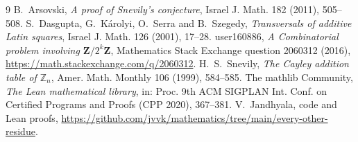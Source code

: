 \documentclass[11pt]{amsart}
\theoremstyle{remark}
\begin{document}
\begin{thebibliography}{9}
 B.~Arsovski, \emph{A proof of Snevily's conjecture}, Israel J. Math. 182 (2011), 505--508.
 S.~Dasgupta, G.~Károlyi, O.~Serra and B.~Szegedy, \emph{Transversals of additive Latin squares}, Israel J. Math. 126 (2001), 17--28.
 user160886, \emph{A Combinatorial problem involving $\mathbf{Z}/2^k\mathbf{Z}$}, Mathematics Stack Exchange question 2060312 (2016), \url{https://math.stackexchange.com/q/2060312}.
 H.~S.~Snevily, \emph{The Cayley addition table of $\mathbb Z_n$}, Amer. Math. Monthly 106 (1999), 584--585.
 The mathlib Community, \emph{The Lean mathematical library}, in: Proc. 9th ACM SIGPLAN Int. Conf. on Certified Programs and Proofs (CPP 2020), 367--381.
 V.~Jandhyala, code and Lean proofs, \url{https://github.com/jvvk/mathematics/tree/main/every-other-residue}.
\end{thebibliography}
\end{document}

